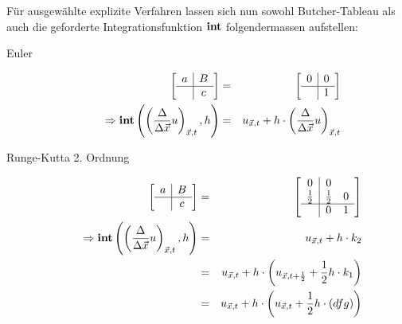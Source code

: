 \documentclass[11pt]{article} %
\theoremstyle{definition}
\begin{document}
Für ausgewählte explizite Verfahren lassen sich nun sowohl Butcher-Tableau als auch die geforderte Integrationsfunktion $\mathbf{int}$ folgendermassen aufstellen:

\begin{description}
\item[Euler]
\begin{eqnarray*}
\begin{bmatrix}
\begin{array}{c|c}
a & B\\
\hline     & c \\
\end{array}
\end{bmatrix}
 &=& \begin{bmatrix}
\begin{array}{c|c}
0 & 0 \\\hline
& 1
\end{array}
\end{bmatrix} \\
\Rightarrow \mathbf{int}\left(\left(\frac{\Delta}{\Delta \vec x}u \right)_{\vec x, t}, h\right) &=& u_{\vec x, t} + h\cdot \left(\frac{\Delta}{\Delta \vec x}u \right)_{\vec x, t}
\end{eqnarray*}

\item[Runge-Kutta 2. Ordnung]
\begin{eqnarray*}
\begin{bmatrix}
\begin{array}{c|c}
a & B\\
\hline     & c \\
\end{array}
\end{bmatrix} &=& \begin{bmatrix}
\begin{array}{c|cc}
0 & 0 \\
\frac 1 2 & \frac 1 2 & 0 \\\hline
& 0 & 1
\end{array}
\end{bmatrix} \\
\Rightarrow \mathbf{int}\left(\left(\frac{\Delta}{\Delta \vec x}u \right)_{\vec x, t}, h\right) &=& u_{\vec x, t} + h\cdot k_2 \\
&=& u_{\vec x, t} + h\cdot \left(u_{\vec x, t + \frac 1 2} + \frac 1 2 h \cdot k_1 \right) \\
&=& u_{\vec x, t} + h\cdot \left(u_{\vec x, t} + \frac 1 2 h \cdot \left( dfg\right) \right)
\end{eqnarray*}


\end{description}
\end{document}
